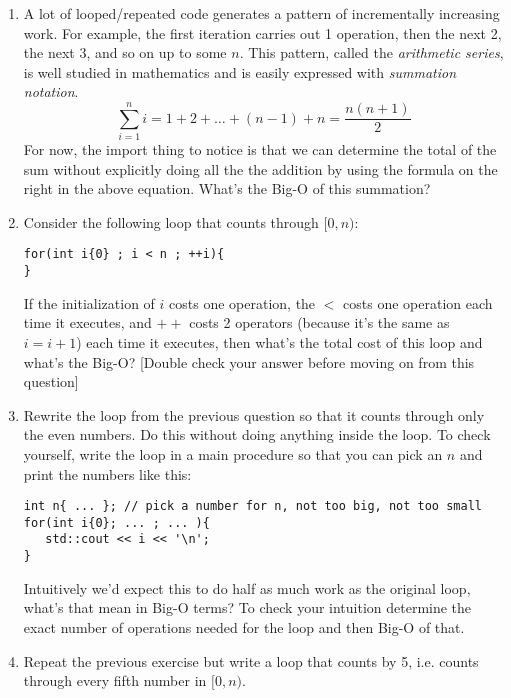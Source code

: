 \documentclass[10pt]{article}
\begin{document}
\begin{enumerate}
\item A lot of looped/repeated code generates a pattern of incrementally increasing work. For example, the first iteration carries out 1 operation, then the next 2, the next 3, and so on up to some $n$. This pattern, called the \textit{arithmetic series}, is well studied in mathematics and is easily expressed with \textit{summation notation}. 
\[
\sum\limits_{i=1}^{n} i = 1 + 2 + \ldots + (n-1) + n =  \dfrac{n(n+1)}{2}
\]
For now, the import thing to notice is that we can determine the total of the sum without explicitly doing all the the addition by using the formula on the right in the above equation. What's the Big-O of this summation? 
\vspace{2in}

\item Consider the following loop that counts through $[0,n)$:
\begin{center}
\begin{lstlisting}
for(int i{0} ; i < n ; ++i){ 
}
\end{lstlisting}
\end{center}
If the initialization of $i$ costs one operation, the $<$ costs one operation each time it executes, and $++$ costs 2 operators (because it's the same as $i=i+1$) each time it executes, then what's the total cost of this loop and what's the Big-O? [Double check your answer before moving on from this question]
\newpage \thispagestyle{empty}

\item Rewrite the loop from the previous question so that it counts through only the even numbers. Do this without doing anything inside the loop. To check yourself, write the loop in a main procedure so that you can pick an $n$ and print the numbers like this:
\begin{lstlisting}
int n{ ... }; // pick a number for n, not too big, not too small
for(int i{0}; ... ; ... ){
   std::cout << i << '\n';
}
\end{lstlisting}
Intuitively we'd expect this to do half as much work as the original loop, what's that mean in Big-O terms? To check your intuition determine the exact number of operations needed for the loop and then Big-O of that. 
\vspace{3in}

\item Repeat the previous exercise but write a loop that counts by 5, i.e. counts through every fifth number in $[0,n)$. 

\newpage \thispagestyle{empty}


\end{enumerate}
\end{document}
